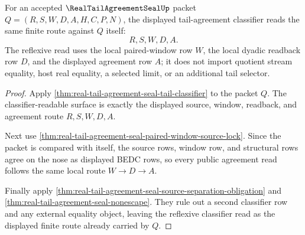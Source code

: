 \begin{theorem}
\label{thm:real-tail-agreement-seal-classifier-reflexivity}
For an accepted $\RealTailAgreementSealUp$ packet $Q=(R,S,W,D,A,H,C,P,N)$, the displayed tail-agreement classifier reads the same finite route against $Q$ itself:
$$
R,S,W,D,A.
$$
The reflexive read uses the local paired-window row $W$, the local dyadic readback row $D$, and the displayed agreement row $A$; it does not import quotient stream equality, host real equality, a selected limit, or an additional tail selector.
\end{theorem}
\begin{proof}
Apply \autoref{thm:real-tail-agreement-seal-tail-classifier} to the packet $Q$. The classifier-readable surface is exactly the displayed source, window, readback, and agreement route $R,S,W,D,A$.

Next use \autoref{thm:real-tail-agreement-seal-paired-window-source-lock}. Since the packet is compared with itself, the source rows, window row, and structural rows agree on the nose as displayed BEDC rows, so every public agreement read follows the same local route $W \to D \to A$.

Finally apply \autoref{thm:real-tail-agreement-seal-source-separation-obligation} and \autoref{thm:real-tail-agreement-seal-nonescape}. They rule out a second classifier row and any external equality object, leaving the reflexive classifier read as the displayed finite route already carried by $Q$.
\end{proof}

